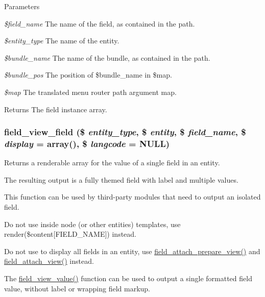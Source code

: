 \begin{DoxyParams}{Parameters}
\item[{\em \$field\_\-name}]The name of the field, as contained in the path. \item[{\em \$entity\_\-type}]The name of the entity. \item[{\em \$bundle\_\-name}]The name of the bundle, as contained in the path. \item[{\em \$bundle\_\-pos}]The position of \$bundle\_\-name in \$map. \item[{\em \$map}]The translated menu router path argument map.\end{DoxyParams}
\begin{DoxyReturn}{Returns}
The field instance array. 
\end{DoxyReturn}
\hypertarget{group__field_gacb7c7349bbe181c174421e23210ae1ba}{
\subsubsection[{field\_\-view\_\-field}]{\setlength{\rightskip}{0pt plus 5cm}field\_\-view\_\-field (\$ {\em entity\_\-type}, \/  \$ {\em entity}, \/  \$ {\em field\_\-name}, \/  \$ {\em display} = {\ttfamily array()}, \/  \$ {\em langcode} = {\ttfamily NULL})}}
\label{group__field_gacb7c7349bbe181c174421e23210ae1ba}
Returns a renderable array for the value of a single field in an entity.

The resulting output is a fully themed field with label and multiple values.

This function can be used by third-\/party modules that need to output an isolated field.
\begin{DoxyItemize}
\item Do not use inside node (or other entities) templates, use render(\$content\mbox{[}FIELD\_\-NAME\mbox{]}) instead.
\item Do not use to display all fields in an entity, use \hyperlink{group__field__attach_ga12b5fce5e2b2adb487c485c63bfe0298}{field\_\-attach\_\-prepare\_\-view()} and \hyperlink{group__field__attach_gaa752a8fd31173fd2308d71eb059e00c7}{field\_\-attach\_\-view()} instead.
\item The \hyperlink{group__field_gab716b21eb481e4f9d9f5f2af71093d81}{field\_\-view\_\-value()} function can be used to output a single formatted field value, without label or wrapping field markup.
\end{DoxyItemize}


